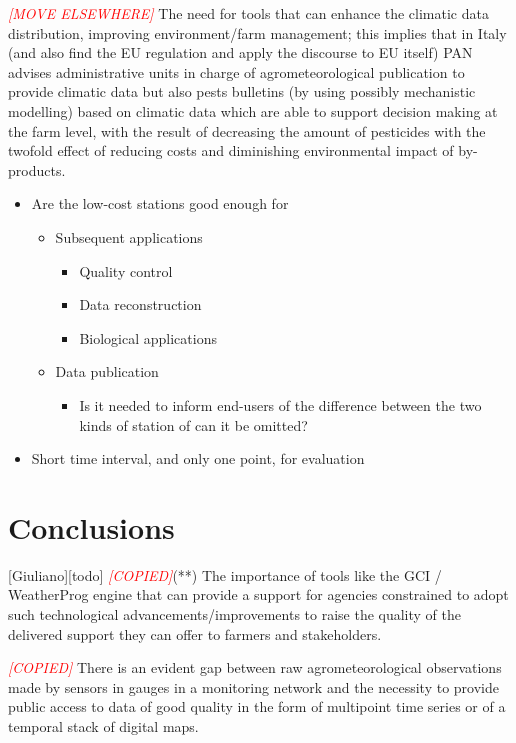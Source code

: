 \documentclass[authoryear,preprint,review,12pt]{elsarticle}
\newcommand{\note}[1]{\emph{\textcolor{red}{#1}}}
\begin{document}
\note{[MOVE ELSEWHERE]} The need for tools that can enhance the climatic data distribution, improving environment/farm management; this implies that in Italy (and also find the EU regulation and apply the discourse to EU itself) PAN advises administrative units in charge of agrometeorological publication to provide climatic data but also pests bulletins (by using possibly mechanistic modelling) based on climatic data which are able to support decision making at the farm level, with the result of decreasing the amount of pesticides with the twofold effect of reducing costs and diminishing environmental impact of by-products.

\begin{itemize}
    \item Are the low-cost stations good enough for
    \begin{itemize}
        \item Subsequent applications
        \begin{itemize}
            \item Quality control
            \item Data reconstruction
            \item Biological applications
        \end{itemize}
        \item Data publication
        \begin{itemize}
            \item Is it needed to inform end-users of the difference between the two kinds of station of can it be omitted?
        \end{itemize}
    \end{itemize}
    \item Short time interval, and only one point, for evaluation
\end{itemize}

\section{Conclusions}[Giuliano][todo]
\note{[COPIED]}(**) The importance of tools like the GCI / WeatherProg engine that can provide a support for agencies constrained to adopt such technological advancements/improvements to raise the quality of the delivered support they can offer to farmers and stakeholders.

\note{[COPIED]} There is an evident gap between raw agrometeorological observations made by sensors in gauges in a monitoring network and the necessity to provide public access to data of good quality in the form of multipoint time series or of a temporal stack of digital maps.
\end{document}
